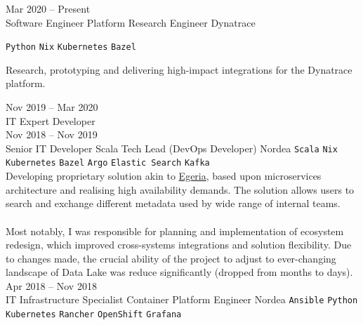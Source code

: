 \documentclass[9pt]{style/developercv}
\begin{document}
\begin{entrylist}
	\entry
	  {Mar 2020 -- Present\\\footnotesize{Software Engineer}}
		{Platform Research Engineer}
		{Dynatrace}
		{
			\texttt{Python}\slashsep
			\texttt{Nix}\slashsep
			\texttt{Kubernetes}\slashsep
			\texttt{Bazel}

			Research, prototyping and delivering high-impact 
			integrations for the Dynatrace platform.
	  }
	\entry
		{Nov 2019 -- Mar 2020\\\footnotesize{IT Expert Developer}
		\\Nov 2018 -- Nov 2019\\\footnotesize{Senior IT Developer}}
		{Scala Tech Lead (DevOps Developer)}
		{Nordea}
		{
			\texttt{Scala}\slashsep
			\texttt{Nix}\slashsep
			\texttt{Kubernetes}\slashsep
			\texttt{Bazel}\slashsep
			\texttt{Argo}\slashsep
			\texttt{Elastic Search}\slashsep
			\texttt{Kafka}\\

			Developing proprietary solution akin to 
			\href{https://egeria.odpi.org}{Egeria}, based upon microservices 
			architecture and realising high availability demands. The solution
			allows users to search and exchange different metadata used by wide
			range of internal teams.\\ \\
			Most notably, I was responsible for planning and implementation of 
			ecosystem redesign, which improved cross-systems integrations and 
			solution flexibility. Due to changes made, the crucial ability of 
			the project to adjust to ever-changing landscape of Data Lake was
			reduce significantly (dropped from months to days). \\
		}
	\entry
		{Apr 2018 -- Nov 2018\\\footnotesize{IT Infrastructure Specialist}}
		{Container Platform Engineer}
		{Nordea}
		{
			\texttt{Ansible}\slashsep
			\texttt{Python}\slashsep
			\texttt{Kubernetes}\slashsep
			\texttt{Rancher}\slashsep
			\texttt{OpenShift}\slashsep
			\texttt{Grafana}\\

}
\end{entrylist}
\end{document}
